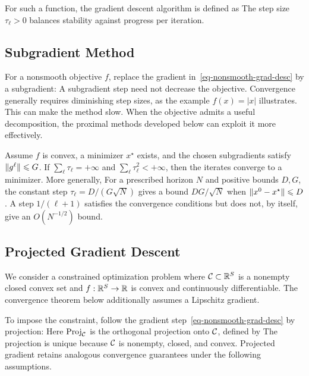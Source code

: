 For such a function, the gradient descent algorithm is defined as
The step size $\tau_\ell>0$ balances stability against progress per iteration.


\subsection{Subgradient Method}

For a nonsmooth objective $f$, replace the gradient in~\eqref{eq-nonsmooth-grad-desc} by a subgradient:
A subgradient step need not decrease the objective. Convergence generally requires diminishing step sizes, as the example $f(x)=|x|$ illustrates. This can make the method slow. When the objective admits a useful decomposition, the proximal methods developed below can exploit it more effectively.

\begin{thm}
Assume $f$ is convex, a minimizer $x^\star$ exists, and the chosen subgradients satisfy $\lVert g^\ell\rVert\leqslant G$. If $\sum_\ell\tau_\ell=+\infty$ and $\sum_\ell\tau_\ell^2<+\infty$, then the iterates converge to a minimizer. More generally,
For a prescribed horizon $N$ and positive bounds $D,G$, the constant step $\tau_\ell=D/(G\sqrt N)$ gives a bound $DG/\sqrt N$ when $\lVert x^0-x^\star\rVert\leqslant D$. A step $1/(\ell+1)$ satisfies the convergence conditions but does not, by itself, give an $O(N^{-1/2})$ bound.
\end{thm}

\subsection{Projected Gradient Descent}
\label{sec-proj-grad}

We consider a constrained optimization problem
where $\mathcal{C} \subset \mathbb{R}^S$ is a nonempty closed convex set and $f : \mathbb{R}^S \rightarrow \mathbb{R}$ is convex and continuously differentiable. The convergence theorem below additionally assumes a Lipschitz gradient.

To impose the constraint, follow the gradient step~\eqref{eq-nonsmooth-grad-desc} by projection:
Here $\operatorname{Proj}_{\mathcal{C}}$ is the orthogonal projection onto $\mathcal{C}$, defined by
The projection is unique because $\mathcal{C}$ is nonempty, closed, and convex.
%
Projected gradient retains analogous convergence guarantees under the following assumptions.

